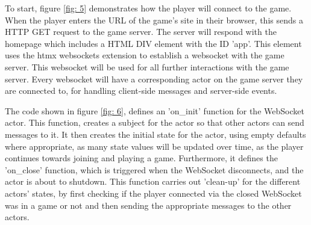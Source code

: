 \documentclass[]{final}
\begin{document}
\noindent
\begin{minipage}[t]{18em}
  \vspace*{-6cm}

  To start, figure \ref{fig: 5} demonstrates how the player will connect to the game.
  When the player enters the URL of the game's site in their browser, this sends a HTTP
  GET request to the game server. The server will respond with the homepage which
  includes a HTML DIV element with the ID 'app'. This element uses the htmx websockets
  extension to establish a websocket with the game server. This websocket will be
  used for all further interactions with the game server. Every websocket will have a corresponding
  actor on the game server they are connected to, for handling client-side messages and
  server-side events.

  \vspace{4em}

  The code shown in figure \ref{fig: 6}, defines an 'on\_init' function for the WebSocket actor. This function,
  creates a subject for the actor so that other actors can send messages to it.
  It then creates the initial state for the actor, using empty defaults where appropriate,
  as many state values will be updated over time, as the player continues towards
  joining and playing a game. Furthermore, it defines the 'on\_close' function,
  which is triggered when the WebSocket disconnects, and the actor is about to shutdown. This function carries out
  'clean-up' for the different actors' states, by first checking if the player
  connected via the closed WebSocket was in a game or not and then sending the
  appropriate messages to the other actors.

  \vspace{18em}

  \label{fig:6}
\end{minipage}
\hfill
\end{document}
